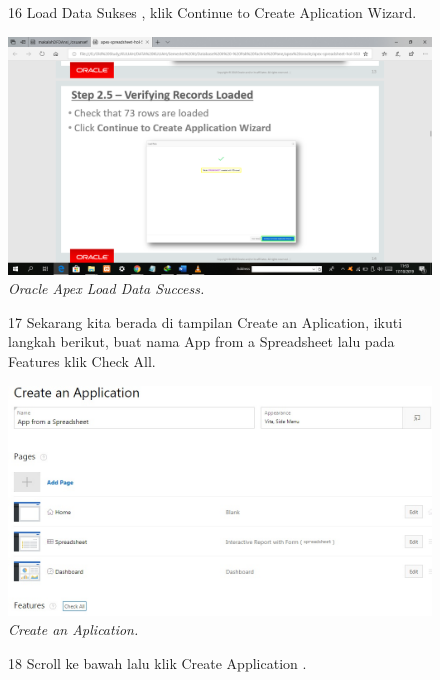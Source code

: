 \begin{enumerate}
\begin{figure}
\item[16] Load Data Sukses , klik Continue to Create Aplication Wizard.

    \begin{center}
\includegraphics[scale=0.2]{figures/pict(12).png}
    \caption{\textit{Oracle Apex Load Data Success.}}
        \end{center}
\label{gambar}
\end{figure}

\begin{figure}
\item[17] Sekarang kita berada di tampilan Create an Aplication, ikuti langkah berikut, buat nama App from a Spreadsheet lalu pada Features klik Check All.

    \begin{center}
\includegraphics[scale=0.4]{figures/create1.jpg}
    \caption{\textit{Create an Aplication.}}
        \end{center}
\label{gambar}
\end{figure}


\begin{figure}
\item[18]Scroll ke bawah lalu klik Create Application .


\end{figure}
\end{enumerate}
